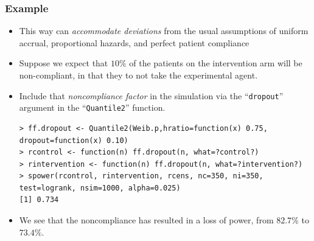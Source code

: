 \documentclass{beamer}
\newcommand{\empr}[1]{{\emph{\color{red}#1}}}
\begin{document}
\pagebreak
\begin{frame}[fragile]
\frametitle{Example}
\begin{itemize}
\item This way can \empr{accommodate deviations} from the usual assumptions of uniform accrual, proportional hazards, and perfect patient compliance
\item Suppose we expect that $10\%$ of the patients on the intervention arm will be non-compliant, in that they to not take the experimental agent.
\item Include that \empr{noncompliance factor} in the simulation via the ``\texttt{dropout}'' argument in the ``\texttt{Quantile2}'' function.
\begin{Verbatim}
> ff.dropout <- Quantile2(Weib.p,hratio=function(x) 0.75,
dropout=function(x) 0.10)
> rcontrol <- function(n) ff.dropout(n, what=?control?)
> rintervention <- function(n) ff.dropout(n, what=?intervention?) 
> spower(rcontrol, rintervention, rcens, nc=350, ni=350,
test=logrank, nsim=1000, alpha=0.025)
[1] 0.734
\end{Verbatim}
\item We see that the noncompliance has resulted in a loss of power, from $82.7\%$ to $73.4\%$.
\end{itemize}
\end{frame}
\end{document}
